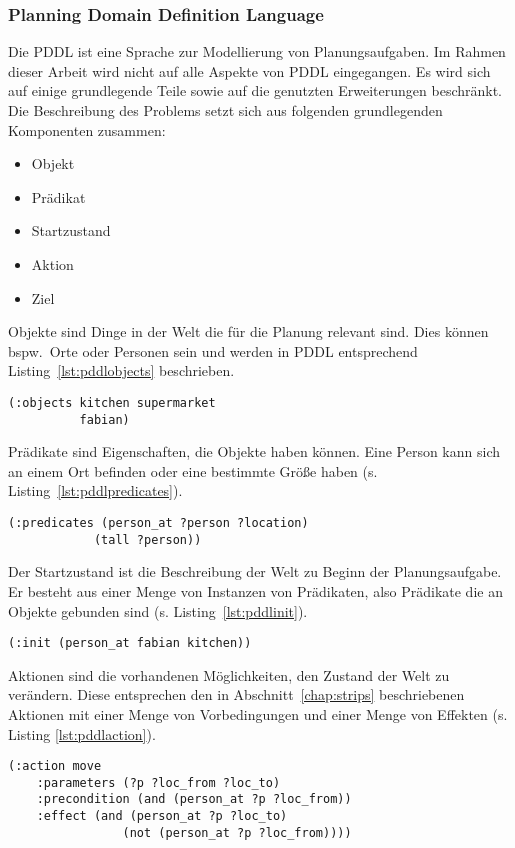 \subsubsection{Planning Domain Definition Language}
Die \ac{PDDL} ist eine Sprache zur Modellierung von Planungsaufgaben.
Im Rahmen dieser Arbeit wird nicht auf alle Aspekte von \ac{PDDL} eingegangen.
Es wird sich auf einige grundlegende Teile sowie auf die genutzten Erweiterungen beschränkt.\\
Die Beschreibung des Problems setzt sich aus folgenden grundlegenden Komponenten zusammen:
\begin{itemize}
    \item Objekt
    \item Prädikat
    \item Startzustand
    \item Aktion
    \item Ziel
\end{itemize}
Objekte sind Dinge in der Welt die für die Planung relevant sind.
Dies können bspw.\ Orte oder Personen sein und werden in \ac{PDDL} entsprechend Listing~\ref{lst:pddlobjects} beschrieben.
\begin{lstlisting}[caption={Objektbeschreibung in PDDL},language=pddl,label={lst:pddlobjects}]
(:objects kitchen supermarket
          fabian)
\end{lstlisting}
Prädikate sind Eigenschaften, die Objekte haben können.
Eine Person kann sich an einem Ort befinden oder eine bestimmte Größe haben (s. Listing~\ref{lst:pddlpredicates}).
\begin{lstlisting}[caption={Prädikatbeschreibung in PDDL},language=pddl,label={lst:pddlpredicates}]
(:predicates (person_at ?person ?location)
            (tall ?person))
\end{lstlisting}
Der Startzustand ist die Beschreibung der Welt zu Beginn der Planungsaufgabe.
Er besteht aus einer Menge von Instanzen von Prädikaten, also Prädikate die an Objekte gebunden sind (s. Listing~\ref{lst:pddlinit}).
\begin{lstlisting}[caption={Startzustand in PDDL},language=pddl,label={lst:pddlinit}]
(:init (person_at fabian kitchen))
\end{lstlisting}
Aktionen sind die vorhandenen Möglichkeiten, den Zustand der Welt zu verändern.
Diese entsprechen den in Abschnitt~\ref{chap:strips} beschriebenen Aktionen mit einer Menge von Vorbedingungen und einer Menge von Effekten (s. Listing \ref{lst:pddlaction}).
\begin{lstlisting}[caption={Aktion um eine Person von einem Ort zum anderen zu bewegen in PDDL},language=pddl,label={lst:pddlaction}]
(:action move
    :parameters (?p ?loc_from ?loc_to)
    :precondition (and (person_at ?p ?loc_from))
    :effect (and (person_at ?p ?loc_to)
                (not (person_at ?p ?loc_from))))
\end{lstlisting}
